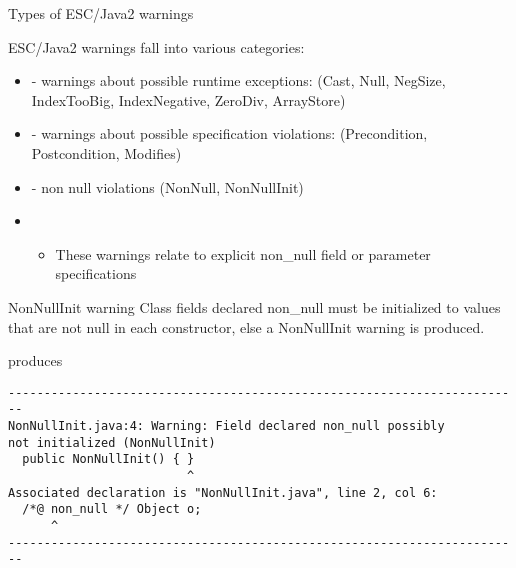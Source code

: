 \documentclass[
pdf,
nocolorBG,
slideColor,
cok,
]{prosper}
\begin{document}
\begin{slide}{Types of ESC/Java2 warnings}
\vspace*{-6ex}

ESC/Java2 warnings fall into various categories:
\begin{itemize}
\item[] - {\gray warnings about possible { runtime exceptions}:
(Cast, Null, NegSize, IndexTooBig, IndexNegative, ZeroDiv, ArrayStore)}

\item[] - {\gray warnings about possible { specification violations}:
(Precondition, Postcondition, Modifies)}

\item[] - {\knalblue non null} violations (NonNull, NonNullInit)

\item[]
\begin{itemize}
\item These warnings relate to explicit {\blue non\_null} field or parameter specifications
\end{itemize}

\end{itemize}
\end{slide}
\begin{slide}{NonNullInit warning}
\vspace*{-6ex}
Class fields declared {\knalblue non\_null} must be initialized to values that are not null in each constructor, else a NonNullInit warning is produced.
\begin{figure*}
\tiny


\end{figure*}
produces
\tiny

\begin{verbatim}
------------------------------------------------------------------------
NonNullInit.java:4: Warning: Field declared non_null possibly 
not initialized (NonNullInit)
  public NonNullInit() { }
                         ^
Associated declaration is "NonNullInit.java", line 2, col 6:
  /*@ non_null */ Object o;
      ^
------------------------------------------------------------------------
\end{verbatim}
\end{slide}
\end{document}
